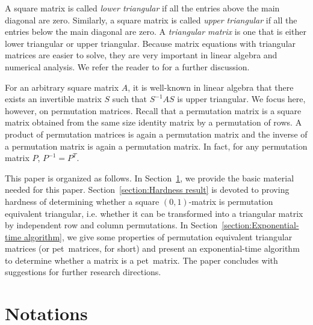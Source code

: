 \documentclass[a4paper,10pt]{llncs}
\newcommand{\PET}{pet}
\begin{document}
A square matrix is called {\em lower triangular} if all the entries above the main diagonal are zero.
Similarly, a square matrix is called {\em upper triangular} if all the entries below the main diagonal
are zero.
A {\em triangular matrix} is one that is either lower triangular or upper triangular.
Because matrix equations with triangular matrices are easier to solve,
they are very important in  linear algebra and numerical analysis.
We refer the reader to \cite{MatrixComputations:1996} for a further discussion.

For an arbitrary square matrix $A$, it is well-known in linear algebra
that there exists an invertible matrix $S$ such that $S^{-1}AS$ is
upper triangular.
We focus here, however, on permutation matrices.
Recall that a permutation matrix is a square matrix obtained from the same
size identity matrix by a permutation of rows. 
A product of permutation matrices is again a permutation matrix and
the inverse of a permutation matrix is again a permutation matrix.
In fact, for any permutation matrix $P$, $P^{-1} = P^T$.



This paper is organized as follows.
In Section~\ref{section:Notations}, we provide the basic material
needed for this paper. %
Section~\ref{section:Hardness result} is devoted to proving hardness of
determining whether a square $(0,1)$-matrix is permutation equivalent
triangular, i.e. whether it can be transformed into a triangular matrix by independent
row and column permutations.
In Section~\ref{section:Exponential-time algorithm}, we give some properties of
permutation equivalent triangular matrices (or \PET\ matrices, for short) and present 
an exponential-time algorithm to determine whether a matrix is a \PET\ matrix.
The paper concludes with suggestions for further research directions.



\section{Notations}
\label{section:Notations}
\end{document}
